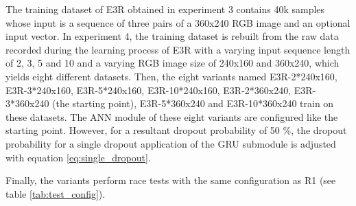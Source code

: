 The training dataset of E3R obtained in experiment 3
contains 40k samples 
whose input is a sequence of 
three pairs of a 360x240 RGB image 
and an optional input vector.
In experiment 4, 
the training dataset is rebuilt from the raw data
recorded during the learning process of E3R
with a varying input sequence length of 
2, 3, 5 and 10
and a varying RGB image size of 
240x160 and 360x240,
which yields eight different datasets.
Then, 
the eight variants
named 
E3R-2*240x160,
E3R-3*240x160,
E3R-5*240x160,
E3R-10*240x160,
E3R-2*360x240,
E3R-3*360x240 (the starting point),
E3R-5*360x240
and
E3R-10*360x240
train on these datasets.
The ANN module of these eight variants
are configured like the starting point.
However, for a resultant dropout probability
of 50 \%, the dropout probability
for a single dropout application of the GRU submodule
is adjusted with equation \ref{eq:single_dropout}.

Finally,
the variants perform
race tests with the same
configuration as R1 (see table \ref{tab:test_config}).









